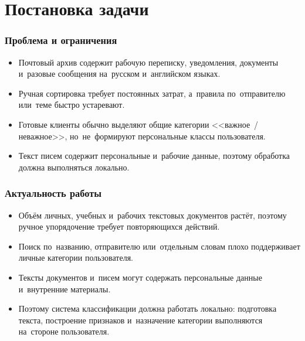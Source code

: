 \begin{frame}
    \setcounter{framenumber}{1}
    \maketitle
\end{frame}

\section{Постановка задачи}

\begin{frame}
    \frametitle{Проблема и ограничения}
    \begin{itemize}
        \item Почтовый архив содержит рабочую переписку, уведомления, документы
              и~разовые сообщения на~русском и~английском языках.
        \item Ручная сортировка требует постоянных затрат, а~правила
              по~отправителю или~теме быстро устаревают.
        \item Готовые клиенты обычно выделяют общие категории
              <<важное~/ неважное>>, но~не~формируют персональные классы
              пользователя.
        \item Текст писем содержит персональные и~рабочие данные, поэтому
              обработка должна выполняться локально.
    \end{itemize}
\end{frame}

\begin{frame}
    \frametitle{Актуальность работы}
    \begin{itemize}
        \item Объём личных, учебных и~рабочих текстовых документов растёт,
              поэтому ручное упорядочение требует повторяющихся действий.
        \item Поиск по~названию, отправителю или~отдельным словам плохо
              поддерживает личные категории пользователя.
        \item Тексты документов и~писем могут содержать персональные данные
              и~внутренние материалы.
        \item Поэтому система классификации должна работать локально:
              подготовка текста, построение признаков и~назначение категории
              выполняются на~стороне пользователя.
    \end{itemize}
\end{frame}

